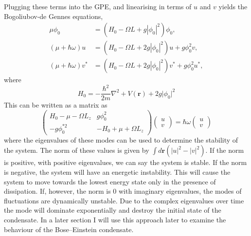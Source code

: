 Plugging these terms into the GPE, and linearising in terms of $u$ and $v$ yields the Bogoliubov-de Gennes equations,
\begin{subequations}\label{eqn:bogo_lhsrhs}
\begin{align}
    \mu \phi_0 &= (H_0 - \Omega L + g |\phi_0|^2)\phi_0,\\
    (\mu +\hbar\omega)u &= (H_0 - \Omega L + 2g|\phi_0|^2)u + g\phi_0^2 v,\\
    (\mu +\hbar\omega)v^{*} &= (H_0 - \Omega L + 2g|\phi_0|^2)v^{*} + g\phi_0^2 u^{*},
\end{align}
\end{subequations}
where
\begin{equation}\label{eqn:bogo_h0}
H_0 = -\frac{\hbar^2}{2m}\nabla^2 + V(\mathbf{r}) + 2g\vert \phi_0 \vert^2
\end{equation}
This can be written as a matrix as
\begin{equation}
    \begin{pmatrix}
        H_0 - \mu -\Omega L_z & g\phi_0^2 \\
        -g\phi_0^{*2} & -H_0 + \mu +\Omega L_z
    \end{pmatrix}
    \begin{pmatrix}
        u \\
        v
    \end{pmatrix}
    = \hbar\omega
    \begin{pmatrix}
        u \\
        v
    \end{pmatrix}
\end{equation}
where the eigenvalues of these modes can be used to determine the stability of the system. The norm of these values is given by $\int d\mathbf{r}(|u|^2 - |v|^2)$. If the norm is positive, with positive eigenvalues, we can say the system is stable. If the norm is negative, the system will have an energetic instability. This will cause the system to move towards the lowest energy state only in the presence of dissipation. If, however, the norm is 0 with imaginary eigenvalues, the modes of fluctuations are dynamically unstable. Due to the complex eigenvalues over time the mode will dominate exponentially and destroy the initial state of the condensate. In a later section I  will use this approach later to examine the behaviour of the Bose--Einstein condensate.

